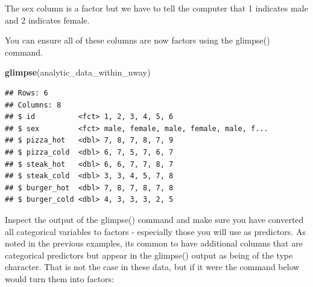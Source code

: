 \documentclass[
]{krantz}
\makeatletter
\newenvironment{Shaded}{\begin{snugshade}}{\end{snugshade}}
\newcommand{\DataTypeTok}[1]{\textcolor[rgb]{0.27,0.27,0.27}{#1}}
\newcommand{\KeywordTok}[1]{\textcolor[rgb]{0.27,0.27,0.27}{\textbf{#1}}}
\newcommand{\NormalTok}[1]{#1}
\newcommand{\OperatorTok}[1]{\textcolor[rgb]{0.43,0.43,0.43}{\textbf{#1}}}
\newcommand{\StringTok}[1]{\textcolor[rgb]{0.5,0.5,0.5}{#1}}
\newenvironment{kframe}{%
\medskip{}
\setlength{\fboxsep}{.8em}
 \def\at@end@of@kframe{}%
 \ifinner\ifhmode%
  \def\at@end@of@kframe{\end{minipage}}%
  \begin{minipage}{\columnwidth}%
 \fi\fi%
 \def\FrameCommand##1{\hskip\@totalleftmargin \hskip-\fboxsep
 \colorbox{shadecolor}{##1}\hskip-\fboxsep
     \hskip-\linewidth \hskip-\@totalleftmargin \hskip\columnwidth}%
 \MakeFramed {\advance\hsize-\width
   \@totalleftmargin\z@ \linewidth\hsize
   \@setminipage}}%
 {\par\unskip\endMakeFramed%
 \at@end@of@kframe}
\renewenvironment{Shaded}{\begin{kframe}}{\end{kframe}}
\makeatother
\begin{document}
\begin{Shaded}
\end{Shaded}

The sex column is a factor but we have to tell the computer that 1 indicates male and 2 indicates female.

\begin{Shaded}
\end{Shaded}

You can ensure all of these columns are now factors using the glimpse() command.

\begin{Shaded}
\begin{Highlighting}[]
\KeywordTok{glimpse}\NormalTok{(analytic_data_within_nway)}
\end{Highlighting}
\end{Shaded}

\begin{verbatim}
## Rows: 6
## Columns: 8
## $ id          <fct> 1, 2, 3, 4, 5, 6
## $ sex         <fct> male, female, male, female, male, f...
## $ pizza_hot   <dbl> 7, 8, 7, 8, 7, 9
## $ pizza_cold  <dbl> 6, 7, 5, 7, 6, 7
## $ steak_hot   <dbl> 6, 6, 7, 7, 8, 7
## $ steak_cold  <dbl> 3, 3, 4, 5, 7, 8
## $ burger_hot  <dbl> 7, 8, 7, 8, 7, 8
## $ burger_cold <dbl> 4, 3, 3, 3, 2, 5
\end{verbatim}

Inspect the output of the glimpse() command and make sure you have converted all categorical variables to factors - especially those you will use as predictors. As noted in the previous examples, its common to have additional columns that are categorical predictors but appear in the glimpse() output as being of the type character. That is not the case in these data, but if it were the command below would turn them into factors:
\end{document}
